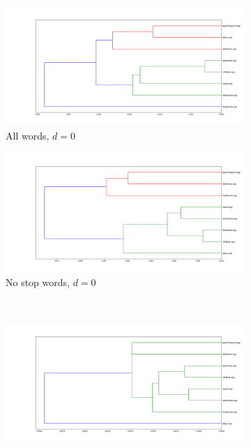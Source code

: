 \documentclass[fleqn]{article}
\begin{document}
	\begin{figure}
		\begin{subfigure}[t]{0.475\textwidth}
			\includegraphics[width=\textwidth]{figures/all_words/dendrogram_d0.png}
			\caption{All words, $d = 0$}
			\label{fig:all:d0}
		\end{subfigure}\hfill
		\begin{subfigure}[t]{0.475\textwidth}
			\includegraphics[width=\textwidth]{figures/stopwords_excluded/dendrogram_d0.png}
			\caption{No stop words, $d = 0$}
			\label{fig:sw:d0}
		\end{subfigure}\hfill
		\\
		\begin{subfigure}[t]{0.475\textwidth}
			\includegraphics[width=\textwidth]{figures/all_words/dendrogram_d1.png}

\end{subfigure}
\end{figure}
\end{document}
